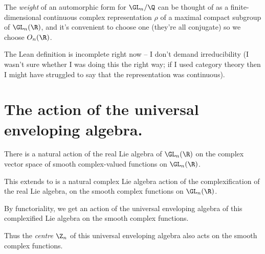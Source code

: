 \begin{definition}
  \label{AutomorphicForm.GLn.Weight}

The \emph{weight} of an automorphic form for $\GL_n/\Q$ can be thought of as a finite-dimensional
continuous complex representation $\rho$ of a maximal compact subgroup of $\GL_n(\R)$,
and it's convenient to choose one (they're all conjugate) so we choose $O_n(\R)$.
\end{definition}

The Lean definition is incomplete right now -- I don't demand irreducibility
(I wasn't sure whether I was doing this the right way; if I used category theory
then I might have struggled to say that the representation was continuous).


\section{The action of the universal enveloping algebra.}

\begin{definition}
  \label{instLieAlgebraAction}
There is a natural action of the real Lie algebra of $\GL_n(\R)$ on the complex vector space of
smooth complex-valued functions on $\GL_n(\R)$.
\end{definition}

\begin{definition}
  \label{instComplexLieAlgebraAction}

  This extends to is a natural complex Lie algebra action of the complexification of
  the real Lie algebra, on the smooth complex functions on $\GL_n(\R)$.

\end{definition}

\begin{definition}
  \label{instUniversalEnvelopingAlgebraAction}
By functoriality, we get an action of the universal enveloping algebra of this
complexified Lie algebra on the smooth complex functions.

\end{definition}

\begin{definition}
\label{instCentreAction}
Thus the \emph{centre} $\Z_n$ of this universal enveloping algebra also acts on the smooth
complex functions.

\end{definition}

